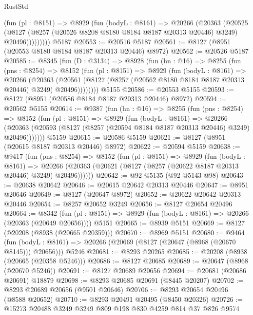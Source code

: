 \begin{lexlean}{RustStd}
\begin{coremodule}
            (fun (pl : @8151) =>
            @8929
              (fun (bodyL : @8161) =>
              @20266
                (@20363
                  (@20525
                    (@8127
                      (@8257 (@20526 @8208 @8180 @8184 @8187 @20313 @20446) @3249)
                      @20496)))))))))
    @5187
@20553 := @20516 @5187
@20561 := @8127 (@8951 (@20553 @8180 @8184 @8187 @20313 @20446) @8972)
@20562 := @20526 @5187
@20585 := @8345
    (fun (D : @3134) =>
    @8928
      (fun (hn : @16) =>
      @8255
        (fun (pns : @8254) =>
        @8152
          (fun (pl : @8151) =>
          @8929
            (fun (bodyL : @8161) =>
            @20266
              (@20363
                (@20561 (@8127 (@8257 (@20562 @8180 @8184 @8187 @20313 @20446) @3249) @20496))))))))
    @5155
@20586 := @20553 @5155
@20593 := @8127 (@8951 (@20586 @8184 @8187 @20313 @20446) @8972)
@20594 := @20562 @5155
@20614 := @9387
    (fun (hn : @16) =>
    @8255
      (fun (pns : @8254) =>
      @8152
        (fun (pl : @8151) =>
        @8929
          (fun (bodyL : @8161) =>
          @20266
            (@20363 (@20593 (@8127 (@8257 (@20594 @8184 @8187 @20313 @20446) @3249) @20496)))))))
    @5159
@20615 := @20586 @5159
@20621 := @8127 (@8951 (@20615 @8187 @20313 @20446) @8972)
@20622 := @20594 @5159
@20638 := @9417
    (fun (pns : @8254) =>
    @8152
      (fun (pl : @8151) =>
      @8929
        (fun (bodyL : @8161) =>
        @20266 (@20363 (@20621 (@8127 (@8257 (@20622 @8187 @20313 @20446) @3249) @20496))))))
@20642 := @92 @5135 (@92 @5143 @98)
@20643 := @20638 @20642
@20646 := @20615 @20642 @20313 @20446
@20647 := @8951 @20646
@20649 := @8127 (@20647 @8972)
@20652 := @20622 @20642 @20313 @20446
@20654 := @8257 @20652 @3249
@20656 := @8127 @20654 @20496
@20664 := @8342
    (fun (pl : @8151) => @8929 (fun (bodyL : @8161) => @20266 (@20363 (@20649 @20656))))
    @5151
@20665 := @8939 @5151
@20669 := @8127 (@20208 (@8938 (@20665 @20359)))
@20670 := @8969 @5151
@20680 := @9464
    (fun (bodyL : @8161) => @20266 (@20669 (@8127 (@20647 (@8968 (@20670 @8145))) @20656)))
    @5246
@20681 := @8293 @20265
@20685 := @20208 (@8938 (@20665 (@20358 @5246)))
@20686 := @8127 @20685
@20689 := @20647 (@8968 (@20670 @5246))
@20691 := @8127 @20689 @20656
@20694 := @20681 (@20686 @20691) @18879
@20698 := @8293 @20685 @20691 (@8445 @20207)
@20702 := @8293 @20689 @20656 (@9501 @20646)
@20706 := @8293 @20654 @20496 (@8588 @20652)
@20710 := @8293 @20491 @20495 (@8450 @20326)
@20726 := @15273
    @20488
    @3249
    @3249
    @809
    @198
    @830
    @4259
    @814
    @37
    @826
    @9574

\end{coremodule}
\end{lexlean}
